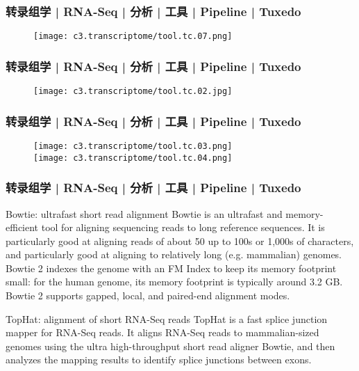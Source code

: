 \begin{frame}
  \frametitle{转录组学 | RNA-Seq | 分析 | 工具 | Pipeline | Tuxedo}
  \begin{figure}
    \centering
    \texttt{[image: c3.transcriptome/tool.tc.07.png]}
  \end{figure}
\end{frame}

\begin{frame}
  \frametitle{转录组学 | RNA-Seq | 分析 | 工具 | Pipeline | Tuxedo}
  \begin{figure}
    \centering
    \texttt{[image: c3.transcriptome/tool.tc.02.jpg]}
  \end{figure}
\end{frame}

\begin{frame}
  \frametitle{转录组学 | RNA-Seq | 分析 | 工具 | Pipeline | Tuxedo}
  \begin{figure}
    \centering
    \texttt{[image: c3.transcriptome/tool.tc.03.png]}\\
    \vspace{0.5em}
    \texttt{[image: c3.transcriptome/tool.tc.04.png]}
  \end{figure}
\end{frame}

\begin{frame}
  \frametitle{转录组学 | RNA-Seq | 分析 | 工具 | Pipeline | Tuxedo}
  \begin{block}{Bowtie: ultrafast short read alignment}
    Bowtie is an ultrafast and memory-efficient tool for aligning sequencing reads to long reference sequences. It is particularly good at aligning reads of about 50 up to 100s or 1,000s of characters, and particularly good at aligning to relatively long (e.g. mammalian) genomes. Bowtie 2 indexes the genome with an FM Index to keep its memory footprint small: for the human genome, its memory footprint is typically around 3.2 GB. Bowtie 2 supports gapped, local, and paired-end alignment modes.
  \end{block}
  \pause
  \begin{block}{TopHat: alignment of short RNA-Seq reads}
    TopHat is a fast splice junction mapper for RNA-Seq reads. It aligns RNA-Seq reads to mammalian-sized genomes using the ultra high-throughput short read aligner Bowtie, and then analyzes the mapping results to identify splice junctions between exons.
  \end{block}
\end{frame}

